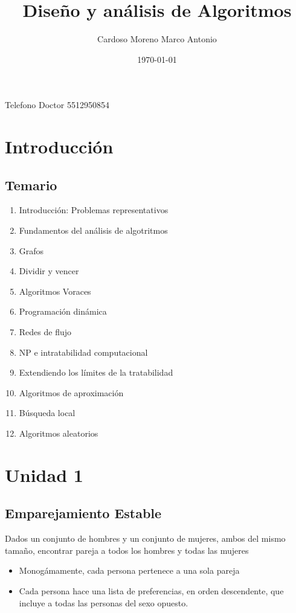 \documentclass[letterpaper]{article}
\author{Cardoso Moreno Marco Antonio}
\date{\today}
\title{Diseño y análisis de Algoritmos}
\begin{document}
\maketitle
\tableofcontents

Telefono Doctor
5512950854
\section{Introducción}
\label{sec:org44ae494}
\subsection{Temario}
\label{sec:org1adb4b2}
\begin{enumerate}
\item Introducción: Problemas representativos
\item Fundamentos del análisis de algotritmos
\item Grafos
\item Dividir y vencer
\item Algoritmos Voraces
\item Programación dinámica
\item Redes de flujo
\item NP e intratabilidad computacional
\item Extendiendo los límites de la tratabilidad
\item Algoritmos de aproximación
\item Búsqueda local
\item Algoritmos aleatorios
\end{enumerate}
\section{Unidad 1}
\label{sec:orgb8b9628}
\subsection{Emparejamiento Estable}
\label{sec:orgb85c481}
Dados un conjunto de hombres y un conjunto de mujeres, ambos del mismo tamaño,
encontrar pareja a todos los hombres y todas las mujeres
\begin{itemize}
\item Monogámamente, cada persona pertenece a una sola pareja
\item Cada persona hace una lista de preferencias, en orden descendente, que incluye
a todas las personas del sexo opuesto.
\end{itemize}
\end{document}
